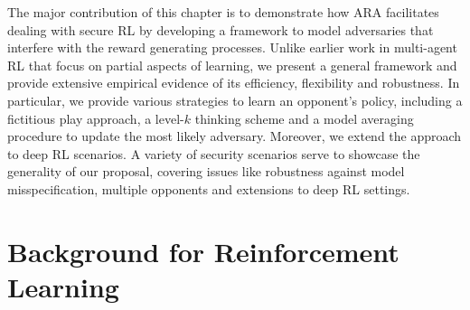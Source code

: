 The major contribution of this chapter is
to demonstrate how ARA facilitates dealing with 
secure RL by developing
a framework to model adversaries that interfere with the reward
generating processes. %
Unlike earlier work in multi-agent RL that focus on partial aspects
of learning, we present a general framework and provide extensive empirical evidence of its efficiency, flexibility and robustness.
In particular, we provide
various strategies to learn an opponent's policy, including a fictitious play approach, a level-$k$ thinking scheme and a model averaging procedure to update the most likely adversary. Moreover, we extend 
the approach to deep RL scenarios.
A variety of security scenarios serve to showcase the 
generality of our proposal, covering issues like robustness
against model misspecification, multiple opponents and extensions
to deep RL settings.
 






\section{Background for Reinforcement Learning}\label{sec:background}

